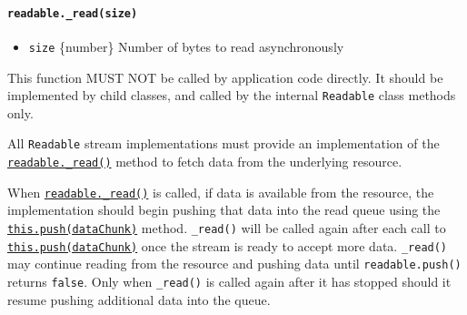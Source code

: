 \begin{Shaded}
\begin{Highlighting}[]
\NormalTok{      \}}
\NormalTok{    \})}\OperatorTok{;}
\NormalTok{  \}}
  \OperatorTok{,}
    \NormalTok{ (}\NormalTok{) \{}
\NormalTok{(}\OperatorTok{,}\KeywordTok{=\textgreater{}} \OperatorTok{||}\OperatorTok{;}
\NormalTok{    \} }\NormalTok{ \{}
      \OperatorTok{;}
\NormalTok{    \}}
\NormalTok{  \}}
\NormalTok{\}}
\end{Highlighting}
\end{Shaded}

\paragraph{\texorpdfstring{\texttt{readable.\_read(size)}}{readable.\_read(size)}}\label{readable._readsize}

\begin{itemize}
\tightlist
\item
  \texttt{size} \{number\} Number of bytes to read asynchronously
\end{itemize}

This function MUST NOT be called by application code directly. It should
be implemented by child classes, and called by the internal
\texttt{Readable} class methods only.

All \texttt{Readable} stream implementations must provide an
implementation of the
\hyperref[readable_readsize]{\texttt{readable.\_read()}} method to fetch
data from the underlying resource.

When \hyperref[readable_readsize]{\texttt{readable.\_read()}} is called,
if data is available from the resource, the implementation should begin
pushing that data into the read queue using the
\hyperref[readablepushchunk-encoding]{\texttt{this.push(dataChunk)}}
method. \texttt{\_read()} will be called again after each call to
\hyperref[readablepushchunk-encoding]{\texttt{this.push(dataChunk)}}
once the stream is ready to accept more data. \texttt{\_read()} may
continue reading from the resource and pushing data until
\texttt{readable.push()} returns \texttt{false}. Only when
\texttt{\_read()} is called again after it has stopped should it resume
pushing additional data into the queue.

